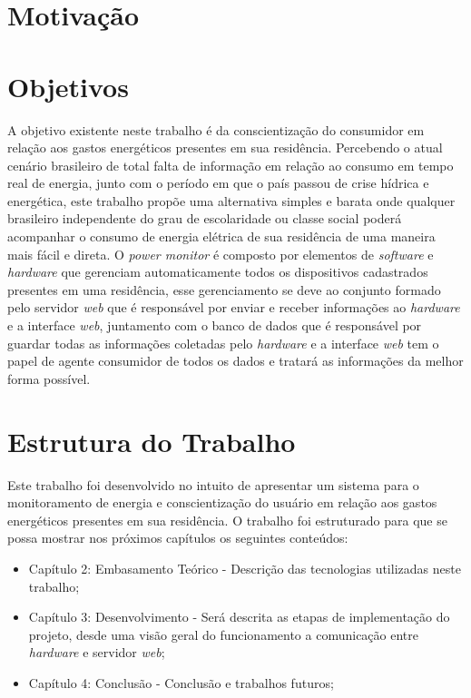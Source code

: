 \section{Motivação}


\section{Objetivos}
A objetivo existente neste trabalho é da conscientização do consumidor em relação aos gastos energéticos presentes em sua residência. Percebendo o
atual cenário brasileiro de total falta de informação em relação ao consumo em tempo real de energia, junto com o período em que o país 
passou de crise hídrica e energética, este trabalho propõe uma alternativa simples e barata onde qualquer brasileiro independente do grau de 
escolaridade ou classe social poderá acompanhar o consumo de energia elétrica de sua residência de uma maneira mais fácil e direta. O \textit{power monitor}
é composto por elementos de \textit{software} e \textit{hardware} que gerenciam automaticamente todos os dispositivos cadastrados presentes em uma
residência, esse gerenciamento se deve ao conjunto formado pelo servidor \textit{web} que é responsável por enviar e receber informações ao \textit{hardware} e
a interface \textit{web}, juntamento com o banco de dados que é responsável por guardar todas as informações coletadas pelo \textit{hardware} e a interface
\textit{web} tem o papel de agente consumidor de todos os dados e tratará as informações da melhor forma possível.


\section{Estrutura do Trabalho}
Este trabalho foi desenvolvido no intuito de apresentar um sistema para o monitoramento de energia e conscientização do usuário em relação aos 
gastos energéticos presentes em sua residência. O trabalho foi estruturado para que se possa mostrar nos próximos capítulos os seguintes conteúdos:
\begin{itemize}
	\item Capítulo 2: Embasamento Teórico - Descrição das tecnologias utilizadas neste trabalho;
	\item Capítulo 3: Desenvolvimento - Será descrita as etapas de implementação do projeto, desde uma visão geral do funcionamento a comunicação entre \textit{hardware} e servidor \textit{web};
	\item Capítulo 4: Conclusão - Conclusão e trabalhos futuros;
\end{itemize}